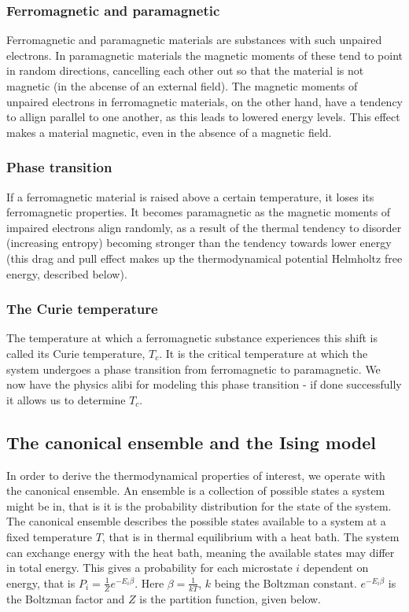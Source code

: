 \documentclass[norsk, 10pt, twocolumn, a4paper]{revtex4}
\begin{document}
\subsubsection{Ferromagnetic and paramagnetic}
Ferromagnetic and paramagnetic materials are substances with such unpaired electrons.
In paramagnetic materials the magnetic moments of these tend to point in random directions,
cancelling each other out so that the material is not magnetic (in the
abcense of an external field). The magnetic moments of unpaired electrons in ferromagnetic
materials, on the other hand, have a tendency to allign parallel to one another, as this
leads to lowered energy levels. This effect makes a material magnetic, even in the absence of a
magnetic field.

\subsubsection{Phase transition}
If a ferromagnetic material is raised above a certain temperature, it loses its ferromagnetic
properties. It becomes paramagnetic as the magnetic moments of impaired electrons align
randomly, as a result of the thermal tendency to disorder (increasing entropy) becoming
stronger than the tendency towards lower energy (this drag and pull effect makes up the
thermodynamical potential Helmholtz free energy, described below).

\subsubsection{The Curie temperature}
The temperature at which a ferromagnetic substance experiences this shift is called its
Curie temperature, $T_c$. It is the critical temperature at which the system undergoes a
phase transition from ferromagnetic to paramagnetic. We now have the physics alibi for modeling
this phase transition - if done successfully it allows us to determine $T_c$.

\subsection{The canonical ensemble and the Ising model}
In order to derive the thermodynamical properties of interest, we operate with the canonical ensemble.
An ensemble is a collection of possible states a system might be in, that is it is the probability distribution for the
state of the system. The canonical ensemble describes the possible states available to a system at a fixed temperature
$T$, that is in thermal equilibrium with a heat bath. The system can exchange energy with the heat bath, meaning
the available states may differ in total energy.
This gives a probability for each microstate $i$ dependent on energy, that is $P_i = \frac{1}{Z}e^{-E_i\beta}$.
Here $\beta = \frac{1}{kT}$, $k$ being the Boltzman constant. $e^{-E_i\beta}$ is the Boltzman factor and $Z$ is the
partition function, given below.
\end{document}
